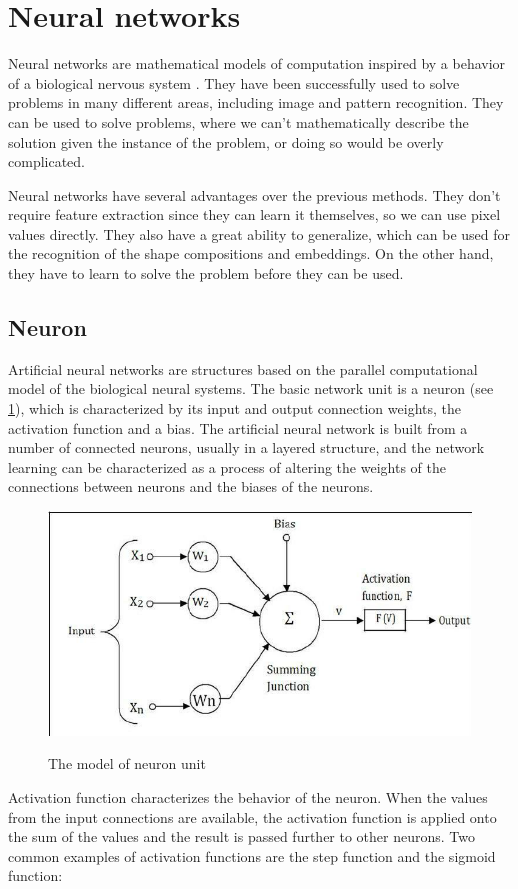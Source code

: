\section{Neural networks}
Neural networks are mathematical models of computation inspired by a behavior of a biological nervous system \cite{bishop}. They have been successfully used to solve problems in many different areas, including image and pattern recognition. They can be used to solve problems, where we can't mathematically describe the solution given the instance of the problem, or doing so would be overly complicated. 

Neural networks have several advantages over the previous methods. They don't require feature extraction since they can learn it themselves, so we can use pixel values directly. They also have a great ability to generalize, which can be used for the recognition of the shape compositions and embeddings. On the other hand, they have to learn to solve the problem before they can be used. 

\subsection{Neuron}
Artificial neural networks are structures based on the parallel computational model of the biological neural systems. The basic network unit is a neuron (see \cref{fig:neuron}), which is characterized by its input and output connection weights, the activation function and a bias. The artificial neural network is built from a number of connected neurons, usually in a layered structure, and the network learning can be characterized as a process of altering the weights of the connections between neurons and the biases of the neurons. 

\begin{figure}
\centering
\includegraphics[width=.5\linewidth]{ext/neuron.png}
\label{fig:neuron}
\caption{The model of neuron unit}
\end{figure}

Activation function characterizes the behavior of the neuron. When the values from the input connections are available, the activation function is applied onto the sum of the values and the result is passed further to other neurons. Two common examples of activation functions are the step function and the sigmoid function:

